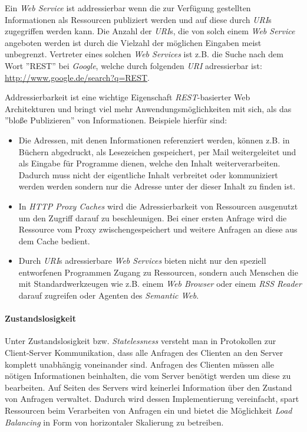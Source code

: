 Ein \textit{Web Service} ist addressierbar wenn die zur Verfügung
gestellten Informationen als Ressourcen publiziert werden und auf
diese durch \textit{URI}s zugegriffen werden kann. Die Anzahl der
\textit{URI}s, die von solch einem \textit{Web Service} angeboten
werden ist durch die Vielzahl der möglichen Eingaben meist unbegrenzt.
Vertreter eines solchen \textit{Web Services} ist z.B. die Suche nach
dem Wort ''REST'' bei \textit{Google}, welche durch folgenden
\textit{URI} adressierbar ist:
\url{http://www.google.de/search?q=REST}.

Addressierbarkeit ist eine wichtige Eigenschaft
\textit{REST}-basierter Web Architekturen und bringt viel mehr
Anwendungsmöglichkeiten mit sich, als das ''bloße Publizieren'' von
Informationen. Beispiele hierfür sind:

\begin{itemize}
\item Die Adressen, mit denen Informationen referenziert werden,
  können z.B. in Büchern abgedruckt, als Lesezeichen gespeichert, per
  Mail weitergeleitet und als Eingabe für Programme dienen, welche den
  Inhalt weiterverarbeiten. Dadurch muss nicht der eigentliche Inhalt
  verbreitet oder kommuniziert werden werden sondern nur die Adresse
  unter der dieser Inhalt zu finden ist.
\item In \textit{HTTP Proxy Caches} wird die Adressierbarkeit von
  Ressourcen ausgenutzt um den Zugriff darauf zu beschleunigen. Bei
  einer ersten Anfrage wird die Ressource vom Proxy
  zwischengespeichert und weitere Anfragen an diese aus dem Cache
  bedient.
\item Durch \textit{URI}s adressierbare \textit{Web Services} bieten
  nicht nur den speziell entworfenen Programmen Zugang zu Ressourcen,
  sondern auch Menschen die mit Standardwerkzeugen wie z.B. einem
  \textit{Web Browser} oder einem \textit{RSS Reader} darauf zugreifen
  oder Agenten des \textit{Semantic Web}.
\end{itemize}

\paragraph{Zustandslosigkeit}
Unter Zustandslosigkeit bzw. \textit{Statelessness} versteht man in
Protokollen zur Client-Server Kommunikation, dass alle Anfragen des
Clienten an den Server komplett unabhängig voneinander sind. Anfragen
des Clienten müssen alle nötigen Informationen beinhalten, die vom
Server benötigt werden um diese zu bearbeiten. Auf Seiten des Servers
wird keinerlei Information über den Zustand von Anfragen
verwaltet. Dadurch wird dessen Implementierung vereinfacht, spart
Ressourcen beim Verarbeiten von Anfragen ein und bietet die
Möglichkeit \textit{Load Balancing} in Form von horizontaler
Skalierung zu betreiben. 

